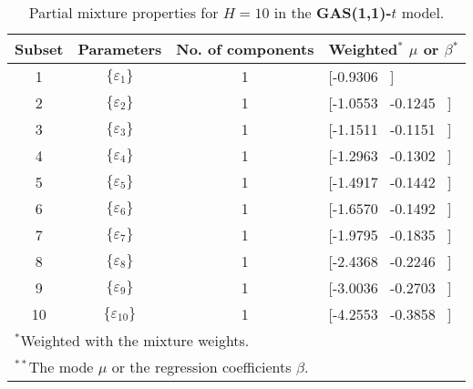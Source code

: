 \footnotesize{  
{ \renewcommand{\arraystretch}{1.3} 
\begin{longtable}{cccp{3.6cm}} 
\caption{Partial mixture properties for $H=10$ in the \textbf{GAS(1,1)-$t$} model.} 
\label{tab:pmits_t_gas_ML} \\ 
 Subset & Parameters & No. of components  & Weighted$^{*}$ $\mu$ or $\beta$$^{*}$ \\ \hline 
1 & $\{\varepsilon_{1}\}$ & 1 & [-0.9306 \, ]   \\ [1ex] 
2 & $\{\varepsilon_{2}\}$ & 1 & [-1.0553 \, -0.1245 \, ]   \\ [1ex] 
3 & $\{\varepsilon_{3}\}$ & 1 & [-1.1511 \, -0.1151 \, ]   \\ [1ex] 
4 & $\{\varepsilon_{4}\}$ & 1 & [-1.2963 \, -0.1302 \, ]   \\ [1ex] 
5 & $\{\varepsilon_{5}\}$ & 1 & [-1.4917 \, -0.1442 \, ]   \\ [1ex] 
6 & $\{\varepsilon_{6}\}$ & 1 & [-1.6570 \, -0.1492 \, ]   \\ [1ex] 
7 & $\{\varepsilon_{7}\}$ & 1 & [-1.9795 \, -0.1835 \, ]   \\ [1ex] 
8 & $\{\varepsilon_{8}\}$ & 1 & [-2.4368 \, -0.2246 \, ]   \\ [1ex] 
9 & $\{\varepsilon_{9}\}$ & 1 & [-3.0036 \, -0.2703 \, ]   \\ [1ex] 
10 & $\{\varepsilon_{10}\}$ & 1 & [-4.2553 \, -0.3858 \, ]   \\ [1ex] 
\hline 
 \multicolumn{4}{l}{\footnotesize{$^{*}$Weighted with the mixture weights.}} \\ 
 \multicolumn{4}{l}{\footnotesize{$^{**}$The mode $\mu$ or the regression coefficients $\beta$.}} \\ 
\end{longtable} 
} 
} 
